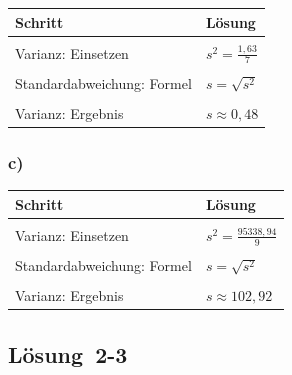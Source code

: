 \documentclass[
  11pt,
  ngerman,
  a4paper,
]{report}
\begin{document}
\begin{table}[H]
\centering
\begin{tabular}{>{\raggedright\arraybackslash}p{8cm}>{\raggedright\arraybackslash}p{8cm}}
\toprule
\textbf{Schritt} & \textbf{Lösung}\\
\midrule
\cellcolor{gray!6}{Varianz: Formel} & \cellcolor{gray!6}{$s^2=\frac{\sum\limits_{i=1}^{n}(x_{i}-\bar{x})^2}{n-1}$}\\
Varianz: Einsetzen & $s^2=\frac{1{,}63}{7}$\\
\cellcolor{gray!6}{Varianz: Ergebnis} & \cellcolor{gray!6}{$s^2=0{,}23$}\\
Standardabweichung: Formel & $s=\sqrt{s^2}$\\
\cellcolor{gray!6}{Standardabweichung: Einsetzen} & \cellcolor{gray!6}{$s=\sqrt{0{,}23}$}\\
Varianz: Ergebnis & $s\approx0{,}48$\\
\bottomrule
\end{tabular}
\end{table}

\hypertarget{c-3}{%
\subsubsection{c)}\label{c-3}}

\begin{table}[H]
\centering
\begin{tabular}{>{\raggedright\arraybackslash}p{8cm}>{\raggedright\arraybackslash}p{8cm}}
\toprule
\textbf{Schritt} & \textbf{Lösung}\\
\midrule
\cellcolor{gray!6}{Varianz: Formel} & \cellcolor{gray!6}{$s^2=\frac{\sum\limits_{i=1}^{n}(x_{i}-\bar{x})^2}{n-1}$}\\
Varianz: Einsetzen & $s^2=\frac{95338{,}94}{9}$\\
\cellcolor{gray!6}{Varianz: Ergebnis} & \cellcolor{gray!6}{$s^2=10593{,}21$}\\
Standardabweichung: Formel & $s=\sqrt{s^2}$\\
\cellcolor{gray!6}{Standardabweichung: Einsetzen} & \cellcolor{gray!6}{$s=\sqrt{10593{,}21}$}\\
Varianz: Ergebnis & $s\approx102{,}92$\\
\bottomrule
\end{tabular}
\end{table}

\hypertarget{loesung-2-3}{%
\subsection{Lösung~2-3}\label{loesung-2-3}}
\end{document}
